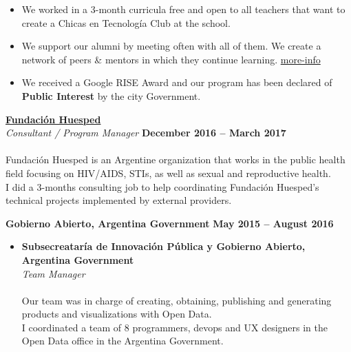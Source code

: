 \documentclass[margin,line]{resume}
\begin{document}
\begin{resume}
\begin{itemize}
\item We worked in a 3-month curricula free and open to all teachers that want to create a Chicas en Tecnolog\'ia Club at the school.

\item We support our alumni by meeting often with all of them. We create a network of peers \& mentors in which they continue learning. \href{http://www.chicasentecnologia.org/comunidad}{more-info} 

\item We received a Google RISE Award and our program has been declared of \textbf{Public Interest} by the city Government.
\end{itemize}

\vspace{-5mm}
\textbf{\href{https://www.huesped.org.ar/}{Fundaci\'on Huesped}}\\\vspace{1mm}
\textsl{Consultant / Program Manager} \hfill \textbf{December 2016 -- March 2017}\vspace{-3mm}\\\vspace{-1mm}
\\
Fundaci\'on Huesped is an Argentine organization that works in the public health field focusing on HIV/AIDS, STIs, as well as sexual and reproductive health.
\\
I did a 3-months consulting job to help coordinating Fundaci\'on Huesped's technical projects implemented by external providers.


\textbf{Gobierno Abierto, Argentina Government}\vspace{2mm}\vspace{1mm} \hfill \textbf{May 2015 -- August 2016}\vspace{-3mm}\\\vspace{-1mm}

\begin{itemize}
\item \textbf{Subsecreatar\'ia de Innovaci\'on P\'ublica y Gobierno Abierto, Argentina Government}\vspace{2mm}\\\vspace{1mm}
\textsl{Team Manager} \hfill \vspace{-3mm}\\\vspace{-1mm}
\\
Our team was in charge of creating, obtaining, publishing and generating products and visualizations with Open Data.
\\
I coordinated a team of 8 programmers, devops and UX designers in the Open Data office in the Argentina Government. 



\end{itemize}
\end{resume}
\end{document}
